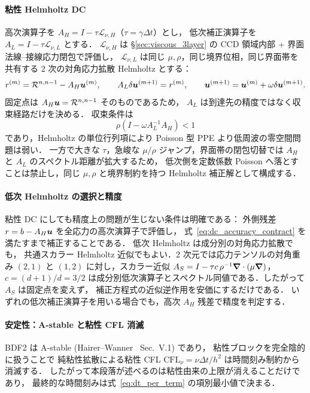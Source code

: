 \paragraph{粘性 Helmholtz DC}
\label{sec:viscous_bdf2_dc}
高次演算子を
$A_H=I-\tau\mathcal{L}_{\nu,H}$（$\tau=\gamma\Delta t$）とし，
低次補正演算子を $A_L=I-\tau\mathcal{L}_{\nu,L}$ とする．
$\mathcal{L}_{\nu,H}$ は §\ref{sec:viscous_3layer} の CCD 領域内部 +
界面法線--接線応力閉包で評価し，
$\mathcal{L}_{\nu,L}$ は同じ $\mu,\rho$，同じ境界位相，同じ界面帯を共有する
2 次の対角応力拡散 Helmholtz とする：
\begin{equation}
  r^{(m)} = \mathcal{R}^{n,n-1}-A_H\bm{u}^{(m)},\qquad
  A_L\delta\bm{u}^{(m+1)} = r^{(m)},\qquad
  \bm{u}^{(m+1)}=\bm{u}^{(m)}+\omega\delta\bm{u}^{(m+1)} .
  \label{eq:viscous_bdf2_dc}
\end{equation}
固定点は $A_H\bm{u}=\mathcal{R}^{n,n-1}$ そのものであるため，
$A_L$ は到達先の精度ではなく収束経路だけを決める．
収束条件は
\begin{equation}
  \rho\!\left(I-\omega A_L^{-1}A_H\right)<1
  \label{eq:viscous_bdf2_dc_contract}
\end{equation}
であり，Helmholtz の単位行列項により Poisson 型 PPE より低周波の零空間問題は弱い．
一方で大きな $\tau$，急峻な $\mu/\rho$ ジャンプ，界面帯の閉包切替では
$A_H$ と $A_L$ のスペクトル距離が拡大するため，
低次側を定数係数 Poisson へ落とすことは禁止し，同じ $\mu,\rho$ と境界制約を持つ
Helmholtz 補正解として構成する．

\paragraph{低次 Helmholtz の選択と精度}
粘性 DC にしても精度上の問題が生じない条件は明確である：
外側残差 $r=b-A_H\bm{u}$ を全応力の高次演算子で評価し，
式~\eqref{eq:dc_accuracy_contract} を満たすまで補正することである．
低次 Helmholtz は成分別の対角応力拡散でも，
共通スカラー Helmholtz 近似でもよい．2 次元では応力テンソルの対角重み
$(2,1)$ と $(1,2)$ に対し，スカラー近似
$A_S=I-\tau c\,\rho^{-1}\bm{\nabla}\cdot(\mu\bm{\nabla})$，$c=(d+1)/d=3/2$
は成分別低次演算子とスペクトル同値である．したがって $A_S$ は固定点を変えず，
補正方程式の近似逆作用を安価にするだけである．
いずれの低次補正演算子を用いる場合でも，高次 $A_H$ 残差で精度を判定する．

\paragraph{安定性：A-stable と粘性 CFL 消滅}
BDF2 は A-stable (Hairer--Wanner~\cite{HairerWanner1996} Sec.~V.1) であり，
粘性ブロックを完全陰的に扱うことで
純粘性拡散による粘性 CFL $\mathrm{CFL}_{\nu}=\nu\Delta t/h^2$
は時間刻み制約から消滅する．
したがって本段落が述べるのは粘性由来の上限が消えることだけであり，
最終的な時間刻みは式~\eqref{eq:dt_per_term} の項別最小値で決まる．

